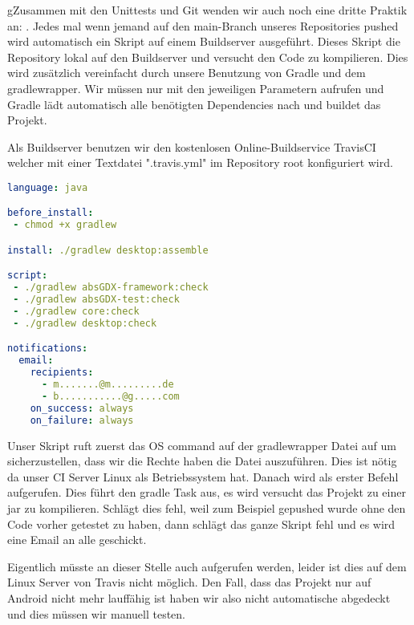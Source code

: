 gZusammen mit den Unittests und Git wenden wir auch noch eine dritte Praktik an: .
Jedes mal wenn jemand auf den main-Branch unseres Repositories pushed wird automatisch ein Skript auf einem Buildserver ausgeführt.
Dieses Skript  die Repository lokal auf den Buildserver und versucht den Code zu kompilieren. Dies wird zusätzlich vereinfacht durch unsere Benutzung von Gradle und dem gradlewrapper. Wir müssen nur  mit den jeweiligen Parametern aufrufen und Gradle lädt automatisch alle benötigten Dependencies nach und buildet das Projekt.

Als Buildserver benutzen wir den kostenlosen Online-Buildservice TravisCI \cite{TRVS} welcher mit einer Textdatei ".travis.yml" im Repository root konfiguriert wird.

\begin{lstlisting}[caption=TravisCI Konfiguration, title=\hspace{0 pt}, language=yaml]
language: java

before_install:
 - chmod +x gradlew

install: ./gradlew desktop:assemble

script: 
 - ./gradlew absGDX-framework:check
 - ./gradlew absGDX-test:check
 - ./gradlew core:check
 - ./gradlew desktop:check

notifications:
  email:
    recipients:
      - m.......@m.........de
      - b...........@g.....com
    on_success: always
    on_failure: always
\end{lstlisting}

Unser Skript ruft zuerst das OS command  auf der gradlewrapper Datei auf um sicherzustellen, dass wir die Rechte haben die Datei auszuführen. Dies ist nötig da unser CI Server Linux als Betriebssystem hat.
Danach wird als erster Befehl  aufgerufen. Dies führt den gradle Task  aus, es wird versucht das Projekt zu einer jar zu kompilieren. Schlägt dies fehl, weil zum Beispiel gepushed wurde ohne den Code vorher getestet zu haben, dann schlägt das ganze Skript fehl und es wird eine Email an alle  geschickt.

Eigentlich müsste an dieser Stelle auch  aufgerufen werden, leider ist dies auf dem Linux Server von Travis nicht möglich. Den Fall, dass das Projekt nur auf Android nicht mehr lauffähig ist haben wir also nicht automatische abgedeckt und dies müssen wir manuell testen.

